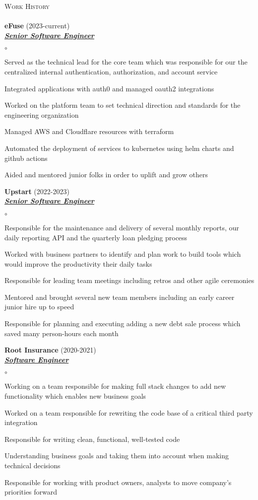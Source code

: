 \documentclass{article}
\newcommand{\lineunder}{\vspace*{-8pt} \\ \hspace*{-18pt} \hrulefill{} \\}
\newcommand{\header}[1]{{\hspace*{-15pt}\vspace*{6pt} \textsc{#1}} \vspace*{-6pt} \lineunder}
\newcommand{\employer}[3]{{ \textbf{#1} (#2)\\ \underline{\textbf{\emph{#3}}}\\  }}
\newenvironment{achievements}{\begin{list}{$\circ$}{\topsep 0pt \itemsep -2pt}}{\vspace*{4pt}\end{list}}
\begin{document}
\header{Work History}
\employer{eFuse}{2023-current}{Senior Software Engineer}
	\begin{achievements}
	\item Served as the technical lead for the core team which was responsible for our the centralized internal authentication, authorization, and account service
	\item Integrated applications with auth0 and managed oauth2 integrations
	\item Worked on the platform team to set technical direction and standards for the engineering organization
	\item Managed AWS and Cloudflare resources with terraform
	\item Automated the deployment of services to kubernetes using helm charts and github actions
	\item Aided and mentored junior folks in order to uplift and grow others
	\end{achievements}
\employer{Upstart}{2022-2023}{Senior Software Engineer}
	\begin{achievements}
	\item Responsible for the maintenance and delivery of several monthly reports, our daily reporting API and the quarterly loan pledging process
	\item Worked with business partners to identify and plan work to build tools which would improve the productivity their daily tasks
	\item Responsible for leading team meetings including retros and other agile ceremonies
	\item Mentored and brought several new team members including an early career junior hire up to speed
	\item Responsible for planning and executing adding a new debt sale process which saved many person-hours each month
	\end{achievements}
\employer{Root Insurance}{2020-2021}{Software Engineer}
	\begin{achievements}
	\item Working on a team responsible for making full stack changes to add new functionality which enables new business goals
	\item Worked on a team responsible for rewriting the code base of a critical third party integration
	\item Responsible for writing clean, functional, well-tested code
	\item Understanding business goals and taking them into account when making technical decisions
	\item Responsible for working with product owners, analysts to move company's priorities forward
	\end{achievements}
\end{document}

